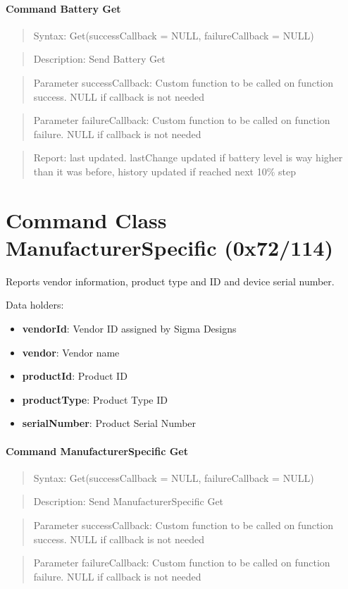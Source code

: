 \paragraph{Command Battery Get}
\begin{quote}Syntax: Get(successCallback = NULL, failureCallback = NULL)\end{quote}
\begin{quote}Description: Send Battery Get\end{quote}
\begin{quote}Parameter successCallback: Custom function to be called on function success. NULL if callback is not needed\end{quote}
\begin{quote}Parameter failureCallback: Custom function to be called on function failure. NULL if callback is not needed\end{quote}
\begin{quote}Report: last updated. lastChange updated if battery level is way higher than it was before, history updated if reached next 10\% step\end{quote}


\section{Command Class ManufacturerSpecific (0x72/114)}

Reports vendor information, product type and ID and device serial number.
\newline

\noindent
Data holders:

\begin{itemize}
\item \textbf{vendorId}: Vendor ID assigned by Sigma Designs
\item \textbf{vendor}: Vendor name
\item \textbf{productId}: Product ID
\item \textbf{productType}: Product Type ID
\item \textbf{serialNumber}: Product Serial Number
\end{itemize}

\paragraph{Command ManufacturerSpecific Get}
\begin{quote}Syntax: Get(successCallback = NULL, failureCallback = NULL)\end{quote}
\begin{quote}Description: Send ManufacturerSpecific Get\end{quote}
\begin{quote}Parameter successCallback: Custom function to be called on function success. NULL if callback is not needed\end{quote}
\begin{quote}Parameter failureCallback: Custom function to be called on function failure. NULL if callback is not needed\end{quote}



